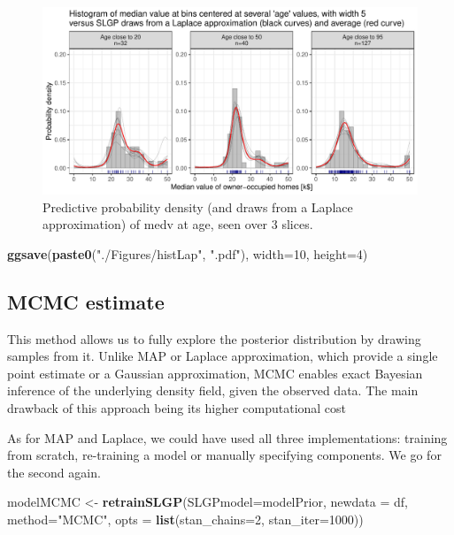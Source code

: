 \documentclass[
]{article}
\newenvironment{Shaded}{\begin{snugshade}}{\end{snugshade}}
\newcommand{\AttributeTok}[1]{\textcolor[rgb]{0.13,0.29,0.53}{#1}}
\newcommand{\DecValTok}[1]{\textcolor[rgb]{0.00,0.00,0.81}{#1}}
\newcommand{\FunctionTok}[1]{\textcolor[rgb]{0.13,0.29,0.53}{\textbf{#1}}}
\newcommand{\NormalTok}[1]{#1}
\newcommand{\OtherTok}[1]{\textcolor[rgb]{0.56,0.35,0.01}{#1}}
\newcommand{\StringTok}[1]{\textcolor[rgb]{0.31,0.60,0.02}{#1}}
\begin{document}
\begin{figure}[H]

{\centering \includegraphics{IntroductionSLGP_files/figure-latex/SLGPLaplaceplot-1} 

}

\caption{Predictive probability density (and draws from a Laplace approximation) of medv at age, seen over 3 slices.}\label{fig:SLGPLaplaceplot}
\end{figure}

\begin{Shaded}
\begin{Highlighting}[]
\FunctionTok{ggsave}\NormalTok{(}\FunctionTok{paste0}\NormalTok{(}\StringTok{"./Figures/histLap"}\NormalTok{,  }\StringTok{".pdf"}\NormalTok{), }\AttributeTok{width=}\DecValTok{10}\NormalTok{, }\AttributeTok{height=}\DecValTok{4}\NormalTok{)}
\end{Highlighting}
\end{Shaded}

\subsection{MCMC estimate}\label{mcmc-estimate}

This method allows us to fully explore the posterior distribution by drawing samples from it. Unlike MAP or Laplace approximation, which provide a single point estimate or a Gaussian approximation, MCMC enables exact Bayesian inference of the underlying density field, given the observed data. The main drawback of this approach being its higher computational cost

As for MAP and Laplace, we could have used all three implementations: training from scratch, re-training a model or manually specifying components. We go for the second again.

\begin{Shaded}
\begin{Highlighting}[]
\NormalTok{modelMCMC  }\OtherTok{\textless{}{-}} \FunctionTok{retrainSLGP}\NormalTok{(}\AttributeTok{SLGPmodel=}\NormalTok{modelPrior, }
                          \AttributeTok{newdata =}\NormalTok{ df, }
                          \AttributeTok{method=}\StringTok{"MCMC"}\NormalTok{,}
                          \AttributeTok{opts =} \FunctionTok{list}\NormalTok{(}\AttributeTok{stan\_chains=}\DecValTok{2}\NormalTok{, }\AttributeTok{stan\_iter=}\DecValTok{1000}\NormalTok{))}
\end{Highlighting}
\end{Shaded}
\end{document}
